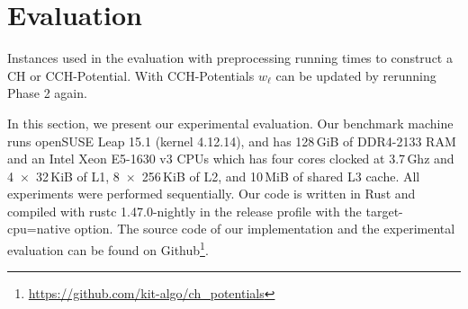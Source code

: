 \documentclass[manuscript,review]{acmart}
\begin{document}
\section{Evaluation}

\label{sec:experiments}

\begin{table}
\centering
\caption{Instances used in the evaluation with preprocessing running times to construct a CH or CCH-Potential. With CCH-Potentials $w_{\ell}$ can be updated by rerunning Phase 2 again.}\label{tab:graphs}

\end{table}

In this section, we present our experimental evaluation.
Our benchmark machine runs openSUSE Leap 15.1 (kernel 4.12.14), and has 128\,GiB of DDR4-2133 RAM and an Intel Xeon E5-1630 v3 CPUs which has four cores clocked at 3.7\,Ghz and 4~$\times$~32\,KiB of L1, 8~$\times$~256\,KiB of L2, and 10\,MiB of shared L3 cache.
All experiments were performed sequentially.
Our code is written in Rust and compiled with rustc 1.47.0-nightly in the release profile with the target-cpu=native option.
The source code of our implementation and the experimental evaluation can be found on Github\footnote{\url{https://github.com/kit-algo/ch_potentials}}.
\end{document}
